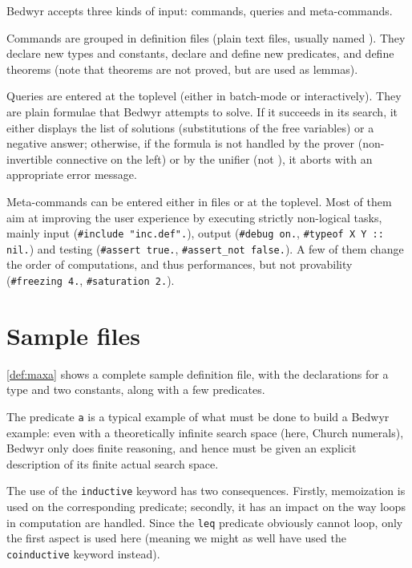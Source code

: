 \documentclass[a4paper]{article} %
\begin{document}
Bedwyr accepts three kinds of input: commands, queries and meta-commands.

Commands are grouped in definition files (plain text files,
usually named ).  They declare new types and constants,
declare and define new predicates, and define theorems
(note that theorems are not proved, but are used as lemmas).

Queries are entered at the toplevel (either in batch-mode or interactively).
They are plain formulae that Bedwyr attempts to solve.
If it succeeds in its search, it either displays the list of solutions
(substitutions of the free variables) or a negative answer; otherwise,
if the formula is not handled by the prover (non-invertible connective on the
left) or by the unifier (not \Ll{}), it aborts with an appropriate error
message.

Meta-commands can be entered either in files or at the toplevel.
Most of them aim at improving the user experience by executing strictly
non-logical tasks, mainly input (\lstinline+#include "inc.def".+), output
(\lstinline+#debug on.+, \lstinline+#typeof X Y :: nil.+) and testing
(\lstinline+#assert true.+, \lstinline+#assert_not false.+).
A few of them change the order of computations, and thus performances, but not
provability (\lstinline+#freezing 4.+, \lstinline+#saturation 2.+).

\section{Sample files}

\autoref{def:maxa} shows a complete sample definition file,
with the declarations for a type and two constants, along with a few predicates.

\begin{figure}
  
\end{figure}

The predicate \lstinline+a+ is a typical example of what must be done to build
a Bedwyr example: even with a theoretically infinite search space
(here, Church numerals), Bedwyr only does finite reasoning, and hence must be
given an explicit description of its finite actual search space.

The use of the \lstinline+inductive+ keyword has two consequences.
Firstly, memoization is used on the corresponding predicate;
secondly, it has an impact on the way loops in computation are handled.
Since the \lstinline+leq+ predicate obviously cannot loop,
only the first aspect is used here (meaning we might as well have used the
\lstinline+coinductive+ keyword instead).
\end{document}
